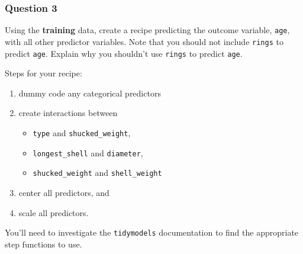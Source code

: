 \documentclass[
]{article}
\providecommand{\tightlist}{%
  \setlength{\itemsep}{0pt}\setlength{\parskip}{0pt}}
\begin{document}
\hypertarget{question-3}{%
\subsubsection{Question 3}\label{question-3}}

Using the \textbf{training} data, create a recipe predicting the outcome
variable, \texttt{age}, with all other predictor variables. Note that
you should not include \texttt{rings} to predict \texttt{age}. Explain
why you shouldn't use \texttt{rings} to predict \texttt{age}.

Steps for your recipe:

\begin{enumerate}
\def\labelenumi{\arabic{enumi}.}
\item
  dummy code any categorical predictors
\item
  create interactions between

  \begin{itemize}
  \tightlist
  \item
    \texttt{type} and \texttt{shucked\_weight},
  \item
    \texttt{longest\_shell} and \texttt{diameter},
  \item
    \texttt{shucked\_weight} and \texttt{shell\_weight}
  \end{itemize}
\item
  center all predictors, and
\item
  scale all predictors.
\end{enumerate}

You'll need to investigate the \texttt{tidymodels} documentation to find
the appropriate step functions to use.
\end{document}
